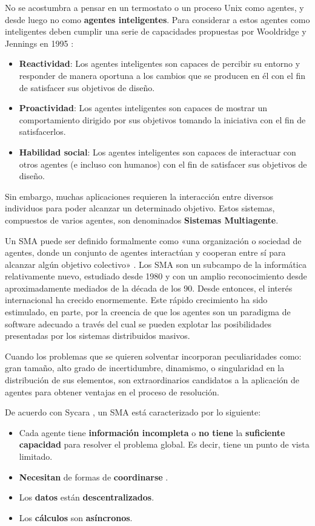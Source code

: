 No se acostumbra a pensar en un termostato o un proceso Unix como agentes, y desde luego no como \textbf{agentes inteligentes}. Para considerar a estos agentes como inteligentes deben cumplir una serie de capacidades propuestas por Wooldridge y Jennings en 1995 \cite{agente}:
\begin{itemize}
\item \textbf{Reactividad}: Los agentes inteligentes son capaces de percibir su entorno y responder de manera oportuna a los cambios que se producen en él con el fin de satisfacer sus objetivos de diseño.
\item \textbf{Proactividad}: Los agentes inteligentes son capaces de mostrar un comportamiento dirigido por sus objetivos tomando la iniciativa con el fin de satisfacerlos.
\item \textbf{Habilidad social}: Los agentes inteligentes son capaces de interactuar con otros agentes (e incluso con humanos) con el fin de satisfacer sus objetivos de diseño.
\end{itemize}

Sin embargo, muchas aplicaciones requieren la interacción entre diversos individuos para poder alcanzar un determinado objetivo. Estos sistemas, compuestos de varios agentes, son denominados \textbf{Sistemas Multiagente}.

Un \acs{SMA} puede ser definido formalmente como «una organización o sociedad de agentes, donde un conjunto de agentes interactúan y cooperan entre sí para alcanzar algún objetivo colectivo» \cite{sma}. Los \acs{SMA} son un subcampo de la informática relativamente nuevo, estudiado desde 1980 y con un amplio reconocimiento desde aproximadamente mediados de la década de los 90. Desde entonces, el interés internacional ha crecido enormemente. Este rápido crecimiento ha sido estimulado, en parte, por la creencia de que los agentes son un paradigma de software adecuado a través del cual se pueden explotar las posibilidades presentadas por los sistemas distribuidos masivos.

Cuando los problemas que se quieren solventar incorporan peculiaridades como: gran tamaño, alto grado de incertidumbre, dinamismo, o singularidad en la distribución de sus elementos, son extraordinarios candidatos a la aplicación de agentes para obtener ventajas en el proceso de resolución. 

De acuerdo con Sycara \cite{sma2}, un \acs{SMA} está caracterizado por lo siguiente:
\begin{itemize}
\item Cada agente tiene \textbf{información incompleta} o \textbf{no tiene} la \textbf{suficiente capacidad} para resolver el problema global. Es decir, tiene un punto de vista limitado.
\item \textbf{Necesitan} de formas de \textbf{coordinarse} .
\item Los \textbf{datos} están \textbf{descentralizados}.
\item Los \textbf{cálculos} son \textbf{asíncronos}.
\end{itemize}

